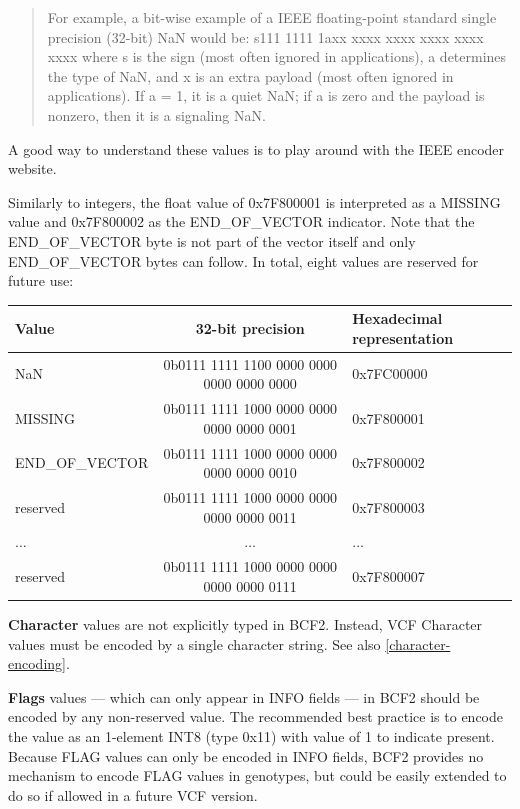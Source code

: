 \documentclass[8pt]{article}
\begin{document}
\begin{quote}
For example, a bit-wise example of a IEEE floating-point standard single precision (32-bit) NaN would be: s111 1111 1axx xxxx xxxx xxxx xxxx xxxx where s is the sign (most often ignored in applications), a determines the type of NaN, and x is an extra payload (most often ignored in applications).
If a = 1, it is a quiet NaN; if a is zero and the payload is nonzero, then it is a signaling NaN.
\end{quote}

\noindent A good way to understand these values is to play around with the IEEE encoder website.

\vspace{0.3cm}
\noindent Similarly to integers, the float value of 0x7F800001 is interpreted as a MISSING value and 0x7F800002 as the END\_OF\_VECTOR indicator. 
Note that the END\_OF\_VECTOR byte is not part of the vector itself and only END\_OF\_VECTOR bytes can follow.
In total, eight values are reserved for future use:


\vspace{0.1cm}
\begin{tabular}{| l | c | l |} \hline
\textbf{Value}   & \textbf{32-bit precision} & \textbf{Hexadecimal representation} \\ \hline
NaN	    & 0b0111 1111 1100 0000 0000 0000 0000 0000 & 0x7FC00000 \\ \hline
MISSING & 0b0111 1111 1000 0000 0000 0000 0000 0001 & 0x7F800001 \\ \hline
END\_OF\_VECTOR & 0b0111 1111 1000 0000 0000 0000 0000 0010 & 0x7F800002 \\ \hline
reserved & 0b0111 1111 1000 0000 0000 0000 0000 0011 & 0x7F800003 \\ \hline
$\ldots$ & $\ldots$ & $\ldots$ \\ \hline
reserved & 0b0111 1111 1000 0000 0000 0000 0000 0111 & 0x7F800007 \\ \hline
\end{tabular}

\vspace{0.3cm}
\textbf{Character} values are not explicitly typed in BCF2.
Instead, VCF Character values must be encoded by a single character string. See also \ref{character-encoding}.

\vspace{0.3cm}
\textbf{Flags} values --- which can only appear in INFO fields --- in BCF2 should be encoded by any non-reserved value.
The recommended best practice is to encode the value as an 1-element INT8 (type 0x11) with value of 1 to indicate present.
Because FLAG values can only be encoded in INFO fields, BCF2 provides no mechanism to encode FLAG values in genotypes, but could be easily extended to do so if allowed in a future VCF version.
\end{document}
